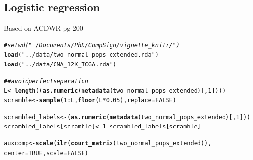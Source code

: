 \documentclass{article}\usepackage[]{graphicx}\usepackage[]{color}
\makeatletter
\newcommand{\hlnum}[1]{\textcolor[rgb]{0.686,0.059,0.569}{#1}}%
\newcommand{\hlstr}[1]{\textcolor[rgb]{0.192,0.494,0.8}{#1}}%
\newcommand{\hlcom}[1]{\textcolor[rgb]{0.678,0.584,0.686}{\textit{#1}}}%
\newcommand{\hlopt}[1]{\textcolor[rgb]{0,0,0}{#1}}%
\newcommand{\hlstd}[1]{\textcolor[rgb]{0.345,0.345,0.345}{#1}}%
\newcommand{\hlkwb}[1]{\textcolor[rgb]{0.69,0.353,0.396}{#1}}%
\newcommand{\hlkwc}[1]{\textcolor[rgb]{0.333,0.667,0.333}{#1}}%
\newcommand{\hlkwd}[1]{\textcolor[rgb]{0.737,0.353,0.396}{\textbf{#1}}}%
\newenvironment{kframe}{%
 \def\at@end@of@kframe{}%
 \ifinner\ifhmode%
  \def\at@end@of@kframe{\end{minipage}}%
  \begin{minipage}{\columnwidth}%
 \fi\fi%
 \def\FrameCommand##1{\hskip\@totalleftmargin \hskip-\fboxsep
 \colorbox{shadecolor}{##1}\hskip-\fboxsep
     \hskip-\linewidth \hskip-\@totalleftmargin \hskip\columnwidth}%
 \MakeFramed {\advance\hsize-\width
   \@totalleftmargin\z@ \linewidth\hsize
   \@setminipage}}%
 {\par\unskip\endMakeFramed%
 \at@end@of@kframe}
\newenvironment{knitrout}{}{} %
\makeatother
\begin{document}
\subsection{Logistic regression}
Based on ACDWR pg 200

\begin{knitrout}
\color{fgcolor}\begin{kframe}
\begin{alltt}
\hlcom{#setwd("~/Documents/PhD/CompSign/vignette_knitr/")}
\hlkwd{load}\hlstd{(}\hlstr{"../data/two_normal_pops_extended.rda"}\hlstd{)}
\hlkwd{load}\hlstd{(}\hlstr{"../data/CNA_12K_TCGA.rda"}\hlstd{)}

\hlcom{## avoid perfect separation}
\hlstd{L} \hlkwb{<-} \hlkwd{length}\hlstd{((}\hlkwd{as.numeric}\hlstd{(}\hlkwd{metadata}\hlstd{(two_normal_pops_extended)[,}\hlnum{1}\hlstd{])))}
\hlstd{scramble} \hlkwb{<-} \hlkwd{sample}\hlstd{(}\hlnum{1}\hlopt{:}\hlstd{L,} \hlkwd{floor}\hlstd{(L}\hlopt{*}\hlnum{0.05}\hlstd{),} \hlkwc{replace} \hlstd{=} \hlnum{FALSE}\hlstd{)}

\hlstd{scrambled_labels} \hlkwb{<-} \hlstd{(}\hlkwd{as.numeric}\hlstd{(}\hlkwd{metadata}\hlstd{(two_normal_pops_extended)[,}\hlnum{1}\hlstd{]))}
\hlstd{scrambled_labels[scramble]} \hlkwb{<-} \hlnum{1}\hlopt{-}\hlstd{scrambled_labels[scramble]}

\hlstd{auxcomp} \hlkwb{<-} \hlkwd{scale}\hlstd{(}\hlkwd{ilr}\hlstd{(}\hlkwd{count_matrix}\hlstd{(two_normal_pops_extended)),}
                 \hlkwc{center} \hlstd{=} \hlnum{TRUE}\hlstd{,} \hlkwc{scale} \hlstd{=} \hlnum{FALSE}\hlstd{)}


\end{alltt}
\end{kframe}
\end{knitrout}
\end{document}
